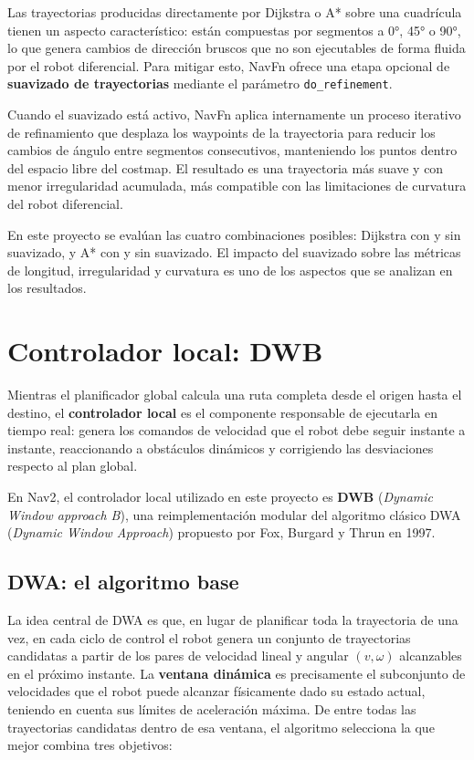 Las trayectorias producidas directamente por Dijkstra o A* sobre una cuadrícula tienen un aspecto característico: están compuestas por segmentos a 0°, 45° o 90°, lo que genera cambios de dirección bruscos que no son ejecutables de forma fluida por el robot diferencial. Para mitigar esto, NavFn ofrece una etapa opcional de \textbf{suavizado de trayectorias} mediante el parámetro \texttt{do\_refinement}.

Cuando el suavizado está activo, NavFn aplica internamente un proceso iterativo de refinamiento que desplaza los waypoints de la trayectoria para reducir los cambios de ángulo entre segmentos consecutivos, manteniendo los puntos dentro del espacio libre del costmap. El resultado es una trayectoria más suave y con menor irregularidad acumulada, más compatible con las limitaciones de curvatura del robot diferencial.

En este proyecto se evalúan las cuatro combinaciones posibles: Dijkstra con y sin suavizado, y A* con y sin suavizado. El impacto del suavizado sobre las métricas de longitud, irregularidad y curvatura es uno de los aspectos que se analizan en los resultados.

\section{Controlador local: DWB}

Mientras el planificador global calcula una ruta completa desde el origen hasta el destino, el \textbf{controlador local} es el componente responsable de ejecutarla en tiempo real: genera los comandos de velocidad que el robot debe seguir instante a instante, reaccionando a obstáculos dinámicos y corrigiendo las desviaciones respecto al plan global.

En Nav2, el controlador local utilizado en este proyecto es \textbf{DWB} (\textit{Dynamic Window approach B})\cite{dwb_nav2}, una reimplementación modular del algoritmo clásico DWA (\textit{Dynamic Window Approach})\cite{fox1997dwa} propuesto por Fox, Burgard y Thrun en 1997.

\subsection{DWA: el algoritmo base}

La idea central de DWA es que, en lugar de planificar toda la trayectoria de una vez, en cada ciclo de control el robot genera un conjunto de trayectorias candidatas a partir de los pares de velocidad lineal y angular $(v, \omega)$ alcanzables en el próximo instante. La \textbf{ventana dinámica} es precisamente el subconjunto de velocidades que el robot puede alcanzar físicamente dado su estado actual, teniendo en cuenta sus límites de aceleración máxima. De entre todas las trayectorias candidatas dentro de esa ventana, el algoritmo selecciona la que mejor combina tres objetivos:

